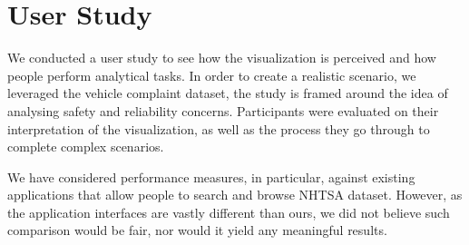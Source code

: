 % 


\section{User Study}
We conducted a user study to see how the visualization is perceived and how
people perform analytical tasks. In order to create a realistic scenario, we
leveraged the vehicle complaint dataset, the study is framed around the idea of
analysing safety and reliability concerns. Participants were evaluated on their
interpretation of the visualization, as well as the process they go through to 
complete complex scenarios. 

We have considered performance measures, in particular, against existing applications
that allow people to search and browse NHTSA dataset. However, as the application
interfaces are vastly different than ours, we did not believe such comparison would
be fair, nor would it yield any meaningful results.



